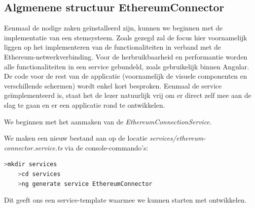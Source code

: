	\subsection{Algmenene structuur EthereumConnector}
	Eenmaal de nodige zaken geïnstalleerd zijn, kunnen we beginnen met de implementatie van een stemsysteem. Zoals gezegd zal de focus hier voornamelijk liggen op het implementeren van de functionaliteiten in verband met  de Ethereum-netwerkverbinding. Voor de herbruikbaarheid en performantie worden alle functionaliteiten in een service gebundeld,  zoals gebruikelijk binnen Angular. De code voor de rest van de applicatie (voornamelijk de visuele componenten en verschillende schermen) wordt enkel kort besproken.  Eenmaal de service geïmplementeerd is, staat het de lezer natuurlijk vrij om er direct zelf mee aan de slag te gaan en er een applicatie rond te ontwikkelen.
	
	 We beginnen met het aanmaken van de \textit{EthereumConnectionService.} 
	
	We maken een nieuw bestand aan op de locatie \textit{services/ethereum-connector.service.ts} via de console-commando's:
	\begin{lstlisting}[numbers=none,language=bash]
	>mkdir services
	>cd services
	>ng generate service EthereumConnector
	\end{lstlisting}
	
	Dit geeft ons een service-template waarmee we kunnen starten met ontwikkelen.
	
